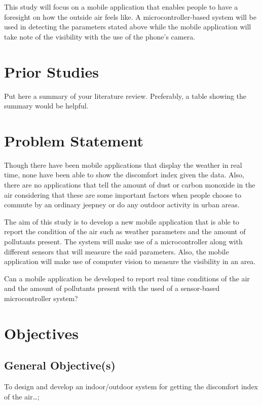 \par \noindent
This study will focus on a mobile application that enables people to have a foresight on how the outside air feels like. A microcontroller-based system will be used in detecting the parameters stated above while the mobile application will take note of the visibility with the use of the phone's camera.

\section{Prior Studies}

Put here a summary of your literature review.  Preferably, a table showing the summary would be helpful. \blindtext



\section{Problem Statement}

Though there have been mobile applications that display the weather in real time, none have been able to show the discomfort index given the data. Also, there are no applications that tell the amount of dust or carbon monoxide in the air considering that these are some important factors when people choose to commute by an ordinary jeepney or do any outdoor activity in urban areas.
\par \noindent
The aim of this study is to develop a new mobile application that is able to report the condition of the air such as weather parameters and the amount of pollutants present. The system will make use of a microcontroller along with different sensors that will measure the said parameters. Also, the mobile application will make use of computer vision to measure the visibility in an area.
\par \noindent
Can a mobile application be developed to report real time conditions of the air and the amount of pollutants present with the used of a sensor-based microcontroller system?

\section{Objectives}
\subsection{General Objective(s)}
To design and develop an indoor/outdoor system for getting the discomfort index of the air\ldots;

